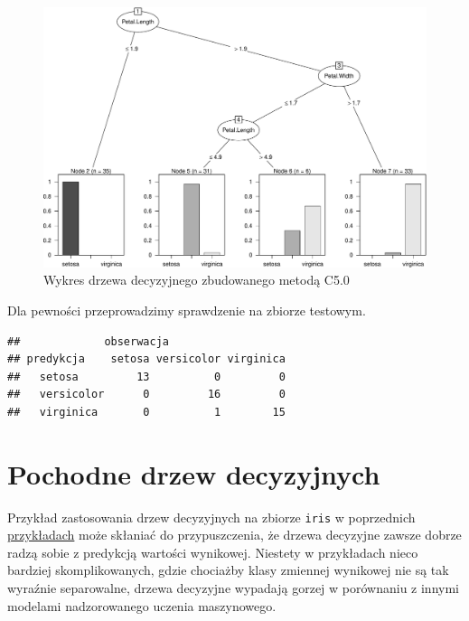 \documentclass[]{book}
\newenvironment{Shaded}{\begin{snugshade}}{\end{snugshade}}
\newcommand{\DataTypeTok}[1]{\textcolor[rgb]{0.13,0.29,0.53}{#1}}
\newcommand{\KeywordTok}[1]{\textcolor[rgb]{0.13,0.29,0.53}{\textbf{#1}}}
\newcommand{\NormalTok}[1]{#1}
\newcommand{\OperatorTok}[1]{\textcolor[rgb]{0.81,0.36,0.00}{\textbf{#1}}}
\newcommand{\StringTok}[1]{\textcolor[rgb]{0.31,0.60,0.02}{#1}}
\theoremstyle{plain}
\theoremstyle{definition}
\theoremstyle{definition}
\theoremstyle{definition}
\theoremstyle{definition}
\theoremstyle{remark}
\begin{document}
\begin{figure}
\centering
\includegraphics{EksploracjaDanych_files/figure-latex/C50-1.pdf}
\caption{\label{fig:C50}Wykres drzewa decyzyjnego zbudowanego metodą C5.0}
\end{figure}

Dla pewności przeprowadzimy sprawdzenie na zbiorze testowym.

\begin{Shaded}
\end{Shaded}

\begin{verbatim}
##             obserwacja
## predykcja    setosa versicolor virginica
##   setosa         13          0         0
##   versicolor      0         16         0
##   virginica       0          1        15
\end{verbatim}

\hypertarget{pochodne-drzew-decyzyjnych}{%
\chapter{Pochodne drzew decyzyjnych}\label{pochodne-drzew-decyzyjnych}}

Przykład zastosowania drzew decyzyjnych na zbiorze \texttt{iris} w poprzednich \protect\hyperlink{przyk41}{przykładach} może skłaniać do przypuszczenia, że drzewa decyzyjne zawsze dobrze radzą sobie z predykcją wartości wynikowej. Niestety w przykładach nieco bardziej skomplikowanych, gdzie chociażby klasy zmiennej wynikowej nie są tak wyraźnie separowalne, drzewa decyzyjne wypadają gorzej w porównaniu z innymi modelami nadzorowanego uczenia maszynowego.
\end{document}
